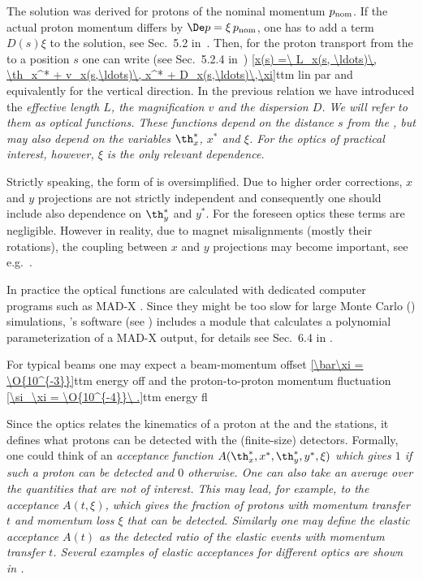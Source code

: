 The solution  was derived for protons of the nominal momentum $p_{\rm nom}$. If the actual proton momentum differs by $\De p = \xi\, p_{\rm nom}$, one has to add a term $D(s) \xi$ to the solution, see Sec.~5.2 in~. Then, for the proton transport from the  to a position $s$ one can write (see Sec.~5.2.4 in~)
\eqref{x(s) =\ L_x(s, \ldots)\, \th_x^* + v_x(s,\ldots)\, x^* + D_x(s,\ldots)\,\xi}{ttm lin par}
and equivalently for the vertical direction. In the previous relation we have introduced the \em{effective length} $L$, the \em{magnification} $v$ and the \em{dispersion} $D$. We will refer to them as \em{optical functions}. These functions depend on the distance $s$ from the , but may also depend on the variables $\th_x^*$, $x^*$ and $\xi$. For the optics of practical interest, however, $\xi$ is the only relevant dependence.

Strictly speaking, the form of  is oversimplified. Due to higher order corrections, $x$ and $y$ projections are not strictly independent and consequently one should include also dependence on $\th_y^*$ and $y^*$. For the foreseen optics these terms are negligible. However in reality, due to magnet misalignments (mostly their rotations), the coupling between $x$ and $y$ projections may become important, see e.g.~.

In practice the optical functions are calculated with dedicated computer programs such as MAD-X . Since they might be too slow for large Monte Carlo () simulations, 's software (see ) includes a module that calculates a polynomial parameterization of a MAD-X output, for details see Sec.~6.4 in .

For typical  beams one may expect a beam-momentum offset
\eqref{\bar\xi = \O{10^{-3}}}{ttm energy off}
and the proton-to-proton momentum fluctuation
\eqref{\si_\xi = \O{10^{-4}}\ .}{ttm energy fl}

Since the optics  relates the kinematics of a proton at the  and the  stations, it defines what protons can be detected with the (finite-size)  detectors. Formally, one could think of an \em{acceptance} function $A(\th_x^*, x^*, \th_y^*, y^*, \xi)$ which gives $1$ if such a proton can be detected and $0$ otherwise. One can also take an average over the quantities that are not of interest. This may lead, for example, to the acceptance $A(t, \xi)$, which gives the fraction of protons with momentum transfer $t$ and momentum loss $\xi$ that can be detected. Similarly one may define the \em{elastic acceptance} $A(t)$ as the detected ratio of the elastic events with momentum transfer $t$. Several examples of elastic acceptances for different optics are shown in .


